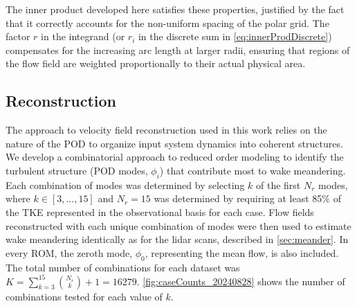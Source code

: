 \documentclass[%
 aip,
 amsmath,
 amssymb,
preprint,%
]{revtex4-2}
\begin{document}
The inner product developed here satisfies these properties, justified by the fact that it correctly accounts for the non-uniform spacing of the polar grid. 
The factor $r$ in the integrand (or $r_i$ in the discrete sum in \cref{eq:innerProdDiscrete}) compensates for the increasing arc length at larger radii, ensuring that regions of the flow field are weighted proportionally to their actual physical area.

\subsection{Reconstruction}
\label{sec:rec}

The approach to velocity field reconstruction used in this work relies on the nature of the POD to organize input system dynamics into coherent structures.
We develop a combinatorial approach to reduced order modeling  to identify the turbulent structure (POD modes, $\phi_i$) that contribute most to wake meandering.
Each combination of modes was determined by selecting $k$ of the first $N_r$ modes, where $k \in[3,...,15]$ and $N_r=15$ was determined by requiring at least 85\% of the TKE represented in the observational basis for each case. 
Flow fields reconstructed with each unique combination of modes were then used to estimate wake meandering identically as for the lidar scans, described in \cref{sec:meander}. 
In every ROM, the zeroth mode, $\phi_0$, representing the mean flow, is also included.
The total number of combinations for each dataset was $K=\sum_{k=3}^{15} \binom{N_r}{k} +1 = 16279$. 
\cref{fig:caseCounts_20240828} shows the number of combinations tested for each value of $k$. 
\end{document}
